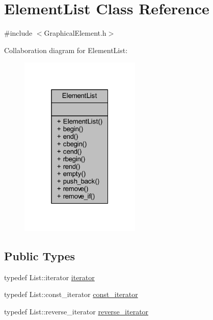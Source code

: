 \hypertarget{class_element_list}{}\section{Element\+List Class Reference}
\label{class_element_list}


{\ttfamily \#include $<$Graphical\+Element.\+h$>$}



Collaboration diagram for Element\+List\+:\nopagebreak
\begin{figure}[H]
\begin{center}
\leavevmode
\includegraphics[width=163pt]{class_element_list__coll__graph}
\end{center}
\end{figure}
\subsection*{Public Types}
\begin{DoxyCompactItemize}
\item 
typedef List\+::iterator \hyperlink{class_element_list_a10e1b0c17ebe441fcd035fcf0a00d25e}{iterator}
\item 
typedef List\+::const\+\_\+iterator \hyperlink{class_element_list_a4323074a8e979322c0bf1eed5c892cf4}{const\+\_\+iterator}
\item 
typedef List\+::reverse\+\_\+iterator \hyperlink{class_element_list_a5a94d1e25a0deeb3f222dc12fa115174}{reverse\+\_\+iterator}
\end{DoxyCompactItemize}
